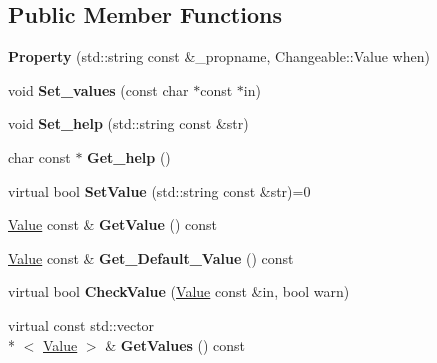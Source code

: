 \subsection*{Public Member Functions}
\begin{DoxyCompactItemize}
\item 
\hypertarget{classProperty_ab65733010b8ea50392b4ea43536c0008}{{\bfseries Property} (std\-::string const \&\-\_\-propname, Changeable\-::\-Value when)}\label{classProperty_ab65733010b8ea50392b4ea43536c0008}

\item 
\hypertarget{classProperty_ae192c83aeb5086ca074c4daa85007de2}{void {\bfseries Set\-\_\-values} (const char $\ast$const $\ast$in)}\label{classProperty_ae192c83aeb5086ca074c4daa85007de2}

\item 
\hypertarget{classProperty_a023caf411f40d81346633b68cf83693d}{void {\bfseries Set\-\_\-help} (std\-::string const \&str)}\label{classProperty_a023caf411f40d81346633b68cf83693d}

\item 
\hypertarget{classProperty_a83a01588ef9bc4b9e3cd5faf57649013}{char const $\ast$ {\bfseries Get\-\_\-help} ()}\label{classProperty_a83a01588ef9bc4b9e3cd5faf57649013}

\item 
\hypertarget{classProperty_ab36313503e43bc6c1294c23d5dba323f}{virtual bool {\bfseries Set\-Value} (std\-::string const \&str)=0}\label{classProperty_ab36313503e43bc6c1294c23d5dba323f}

\item 
\hypertarget{classProperty_a8972c72f3a4d10e20782cb7dc7800bea}{\hyperlink{classValue}{Value} const \& {\bfseries Get\-Value} () const }\label{classProperty_a8972c72f3a4d10e20782cb7dc7800bea}

\item 
\hypertarget{classProperty_a665dc0efff99aa4e29162bf87b287f9b}{\hyperlink{classValue}{Value} const \& {\bfseries Get\-\_\-\-Default\-\_\-\-Value} () const }\label{classProperty_a665dc0efff99aa4e29162bf87b287f9b}

\item 
\hypertarget{classProperty_a916d05a8fb70701e54d391d737d19209}{virtual bool {\bfseries Check\-Value} (\hyperlink{classValue}{Value} const \&in, bool warn)}\label{classProperty_a916d05a8fb70701e54d391d737d19209}

\item 
\hypertarget{classProperty_a075dc0610fe9aba50a50ce8f099c0751}{virtual const std\-::vector\\*
$<$ \hyperlink{classValue}{Value} $>$ \& {\bfseries Get\-Values} () const }\label{classProperty_a075dc0610fe9aba50a50ce8f099c0751}


\end{DoxyCompactItemize}
